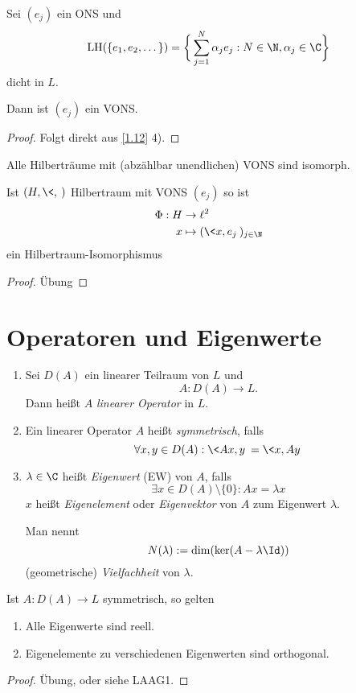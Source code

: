 \documentclass{mycourse}
\newcommand{\LH}{\operatorname{LH}}
\begin{document}
\begin{nt} \label{1.15}
	Sei $(e_j)$ ein ONS und
	\[
		\LH(\{e_1,e_2,\dotsc\}) = \bigg\{ \sum_{j=1}^N \alpha_j e_j : N \in \N, \alpha_j \in \C \bigg\}
	\]
	dicht in $L$.

	Dann ist $(e_j)$ ein VONS.
	\begin{proof}
		Folgt direkt aus \ref{1.12} 4).
	\end{proof}
\end{nt}

\begin{st} \label{1.16}
	Alle Hilberträume mit (abzählbar unendlichen) VONS sind isomorph. 

	Ist $(H,\<,\>)$ Hilbertraum mit VONS $(e_j)$ so ist
	\begin{align*}
		\Phi: H &\to \ell^2 \\
		x &\mapsto (\<x,e_j\>)_{j\in \N}
	\end{align*}
	ein Hilbertraum-Isomorphismus
	\begin{proof}
		Übung
	\end{proof}
\end{st}



\section{Operatoren und Eigenwerte}



\begin{df} \label{1.17}
	\begin{enumerate}[1)]
		\item
			Sei $D(A)$ ein linearer Teilraum von $L$ und
			\[
				A : D(A) \to L.
			\]
			Dann heißt $A$ \emph{linearer Operator} in $L$.
		\item
			Ein linearer Operator $A$ heißt \emph{symmetrisch}, falls
			\[
				\forall x,y \in D(A) : \<Ax,y\> = \<x,Ay\>
			\]
		\item
			$\lambda \in \C$ heißt \emph{Eigenwert} (EW) von $A$, falls
			\[
				\exists x \in D(A) \setminus \{0\} : Ax = \lambda x
			\]
			$x$ heißt \emph{Eigenelement} oder \emph{Eigenvektor} von $A$ zum Eigenwert $\lambda$.

			Man nennt
			\[
				N(\lambda) := \dim (\ker(A-\lambda \Id))
			\]
			(geometrische) \emph{Vielfachheit} von $\lambda$.
	\end{enumerate}
\end{df}

\begin{st} \label{1.18}
	Ist $A: D(A) \to L$ symmetrisch, so gelten
	\begin{enumerate}[1)]
		\item
			Alle Eigenwerte sind reell.
		\item
			Eigenelemente zu verschiedenen Eigenwerten sind orthogonal.
	\end{enumerate}
	\begin{proof}
		Übung, oder siehe LAAG1.
	\end{proof}
\end{st}
\end{document}
